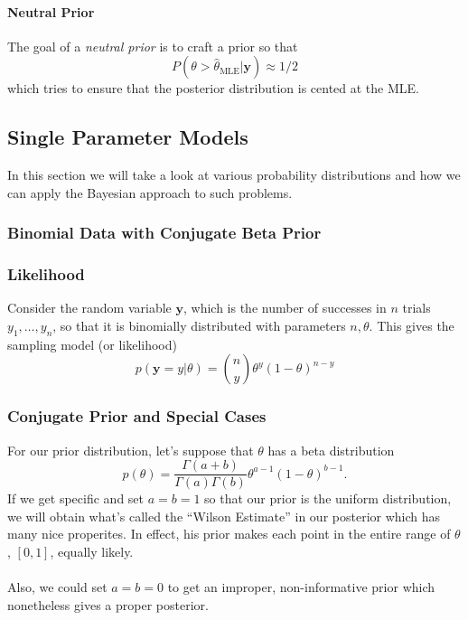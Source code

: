 \documentclass[12pt]{article}
\theoremstyle{plain}
\theoremstyle{definition}
\theoremstyle{remark}
\begin{document}
\paragraph{Neutral Prior} The goal of a \emph{neutral prior} is to
craft a prior so that
   \[ P(\theta > \hat{\theta}_{\text{MLE}} | \mathbf{y}) \approx 1/2 \]
which tries to ensure that the posterior distribution is cented at the
MLE.




\newpage

\subsection{Single Parameter Models}

In this section we will take a look at various probability distributions
and how we can apply the Bayesian approach to such problems.


\subsubsection{Binomial Data with Conjugate Beta Prior}

\subsubsection{Likelihood}

Consider the random variable $\mathbf{y}$,
which is the number of successes in
$n$ trials $y_1, \ldots, y_n$, so that it is binomially distributed
with parameters $n,\theta$. This gives the sampling model (or
likelihood)
   \[p(\mathbf{y} = y | \theta) = \binom{n}{y} \theta^y (1-\theta)^{n-y}
      \]

\subsubsection{Conjugate Prior and Special Cases}

For our prior distribution, let's suppose that $\theta$ has a beta
distribution
   \[ p(\theta) = \frac{\Gamma(a + b)}{\Gamma(a)\Gamma(b)}
      \theta^{a-1}(1-\theta)^{b-1}.\]
If we get specific and set $a=b=1$ so that our prior is the uniform
distribution,
we will obtain what's called the ``Wilson Estimate'' in our
posterior which has
many nice properites. In effect, his prior makes each point in the
entire range of $\theta$, $[0,1]$, equally likely.
\\
\\
Also, we could set $a=b=0$ to get an improper, non-informative prior
which nonetheless gives a proper posterior.
\end{document}

